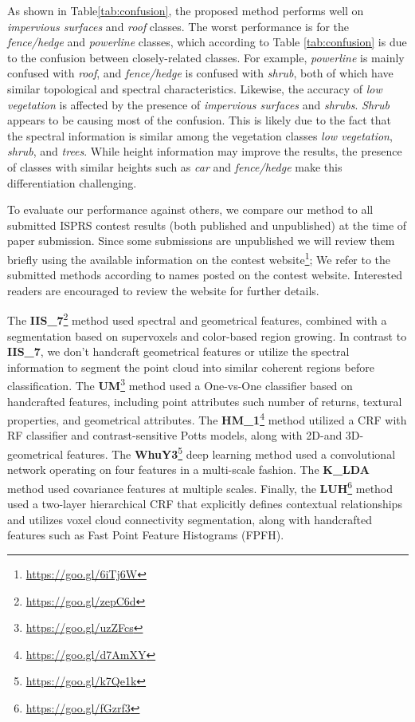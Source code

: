 \documentclass[final,3p,times,twocolumn,authoryear]{elsarticle}
\newcommand{\mxy}[1]{ \color{red}{#1}}
\begin{document}
As shown in Table\ref{tab:confusion}, the proposed method performs well on {\it impervious surfaces} and {\it roof} classes. 
The worst performance is for the {\it fence/hedge} and {\it powerline} classes, which according to Table \ref{tab:confusion} is due to the confusion between closely-related classes. 
For example, {\it powerline} is mainly confused with {\it roof}, and {\it fence/hedge} is confused with {\it shrub}, both of which have similar topological and spectral characteristics. 
Likewise, the accuracy of {\it low vegetation} is affected by the presence of {\it impervious surfaces} and {\it shrubs}. 
{\it Shrub} appears to be causing most of the confusion. 
This is likely due to the fact that the spectral information is similar among the vegetation classes {\it low vegetation}, {\it shrub}, and {\it trees}. 
While height information may improve the results, the presence of classes with similar heights such as {\it car} and {\it fence/hedge} make this differentiation challenging. 

To evaluate our performance against others, we compare our method to all submitted ISPRS contest results (both published and unpublished) at the time of paper submission. 
Since some submissions are unpublished we will review them briefly using the available information on the contest website\footnote{\url{https://goo.gl/6iTj6W}};  
We refer to the submitted methods according to names posted on the contest website. 
Interested readers are encouraged to review the website for further details. 

The {\bf IIS\_7}\footnote{\url{https://goo.gl/zepC6d}}  method used spectral and geometrical features, combined with a segmentation based on supervoxels and color-based region growing. 
In contrast to {\bf IIS\_7}, we don't handcraft geometrical features or utilize the spectral information to segment the point cloud into similar coherent regions before classification. 
The {\bf UM}\footnote{\url{https://goo.gl/uzZFcs}} method used a One-vs-One classifier based on handcrafted features, including point attributes such number of returns, textural properties, and geometrical attributes. 
The {\bf HM\_1}\footnote{\url{https://goo.gl/d7AmXY}} method utilized a CRF with RF classifier and contrast-sensitive Potts models, along with 2D-and 3D-geometrical features. 
The {\bf WhuY3}\footnote{\url{https://goo.gl/k7Qe1k}} deep learning method used a convolutional network operating on four features in a multi-scale fashion. 
The {\bf K\_LDA}~\citep{Blomley16} method used covariance features at multiple scales. 
Finally, the {\bf LUH}\footnote{\url{https://goo.gl/fGzrf3}} method used a two-layer hierarchical CRF that explicitly defines contextual relationships and utilizes voxel cloud connectivity segmentation, along with handcrafted features such as Fast Point Feature Histograms (FPFH).%
\end{document}
